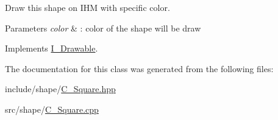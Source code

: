 Draw this shape on I\+HM with specific color. 


\begin{DoxyParams}{Parameters}
{\em color} & \+: color of the shape will be draw \\
\hline
\end{DoxyParams}


Implements \hyperlink{classI__Drawable_a25f6474325614c451a91f019e5fe8010}{I\+\_\+\+Drawable}.



The documentation for this class was generated from the following files\+:\begin{DoxyCompactItemize}
\item 
include/shape/\hyperlink{C__Square_8hpp}{C\+\_\+\+Square.\+hpp}\item 
src/shape/\hyperlink{C__Square_8cpp}{C\+\_\+\+Square.\+cpp}\end{DoxyCompactItemize}
